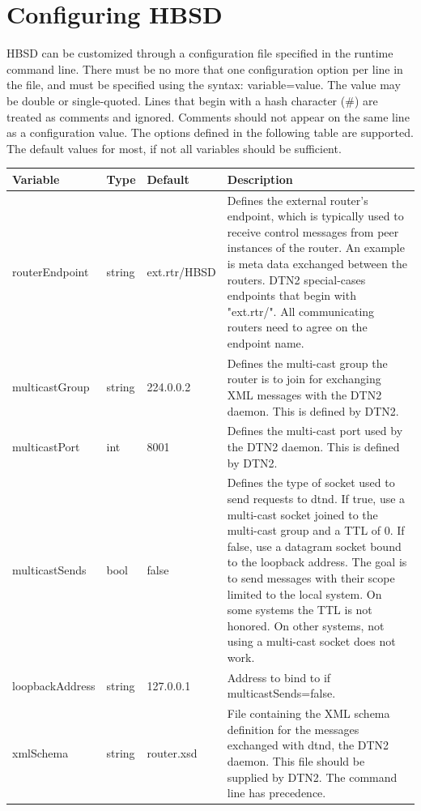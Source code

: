 \section{Configuring HBSD}

HBSD can be customized through a configuration file specified in the runtime command line.  
There must be no more that one configuration option per line in the file, and must be specified using the syntax: variable=value. The value may be double or single-quoted. Lines that begin with a hash character ($\#$) are treated as comments and ignored. Comments should not appear on the same line as a configuration value. The options defined in the following table are supported. The default values for most, if not all variables should be sufficient.

\begin{longtable}[!h]{|p{4cm}|p{1cm}|p{2.2cm}|p{5cm}|}
\hline
\textbf{Variable}& \textbf{Type} & \textbf{Default} & \textbf{Description} \\
\hline
routerEndpoint &  string & ext.rtr/HBSD & Defines the external router's endpoint, which is typically  used to receive control 
messages from peer  instances of the router. An 
example is meta data exchanged between the 
routers. DTN2 special-cases endpoints that begin with 
"ext.rtr/". All communicating routers need to agree on the  endpoint name.\\
\hline
multicastGroup & string &  224.0.0.2 & Defines the multi-cast group the router is to join for  exchanging XML messages 
with the DTN2 daemon. This is defined by DTN2.\\
\hline
multicastPort & int & 8001 & Defines the multi-cast port  used by the DTN2 daemon. This is defined by DTN2.\\
\hline
multicastSends & bool & false & Defines the type of socket used to send requests to
dtnd. If true, use a multi-cast socket joined to the multi-cast group and a TTL of 0. If false, use a datagram socket bound to the 
loopback address. The goal is to send messages with their scope limited to the 
local system. On some systems the TTL is not honored. On other systems, not using a multi-cast socket does not work. \\
\hline
loopbackAddress & string & 127.0.0.1 & Address to bind to if multicastSends=false.\\
\hline
xmlSchema & string  & router.xsd& File containing the XML schema definition for the 
messages exchanged with dtnd, the DTN2 daemon. This file should be supplied by DTN2. The command line has precedence.\\

\end{longtable}

